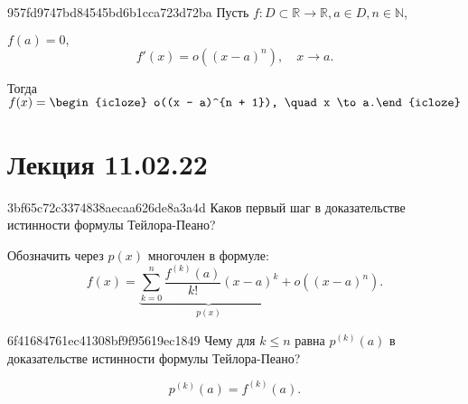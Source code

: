 \begin{note}{957fd9747bd84545bd6b1cca723d72ba}
    Пусть \( f : D \subset \mathbb R \to \mathbb R, a \in D, n \in \mathbb N \), \begin{icloze}{2}\(f(a) = 0, \)
    \[
        f'(x) = o((x - a)^{n} ), \quad x \to a.
    \]\end{icloze}

    Тогда \( f(x) = \begin{icloze}{1}o((x - a)^{n + 1}), \quad x \to a.\end{icloze} \)
\end{note}


\section{Лекция 11.02.22}
\begin{note}{3bf65c72c3374838aecaa626de8a3a4d}
    Каков первый шаг в доказательстве истинности формулы Тейлора-Пеано?

    \begin{cloze}{1}
        Обозначить через \( p(x) \) многочлен в формуле:
        \[
            f(x) = \underbrace{\sum_{k=0}^{n} \frac{f^{(k)} (a)}{k!} (x - a)^{k}}_{p(x)}  + o((x - a)^{n} ).
        \]
    \end{cloze}
\end{note}

\begin{note}{6f41684761ec41308bf9f95619ec1849}
    Чему для \( k \leqslant n \) равна \( p^{(k)} (a) \) в доказательстве истинности формулы Тейлора-Пеано?

    \begin{cloze}{1}
        \[
            p^{(k)} (a) = f^{(k)} (a).
        \]
    \end{cloze}
\end{note}

